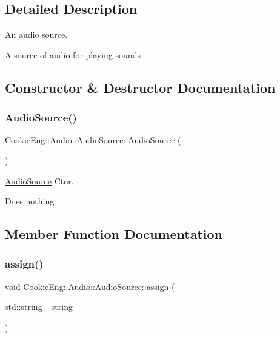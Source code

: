 \subsection{Detailed Description}
An audio source. 

A source of audio for playing sounds 

\subsection{Constructor \& Destructor Documentation}
\mbox{\label{class_cookie_eng_1_1_audio_1_1_audio_source_abf91fca0d4acf97b091efae22f3b4be8}} 
\subsubsection{\texorpdfstring{Audio\+Source()}{AudioSource()}}
{\footnotesize\ttfamily Cookie\+Eng\+::\+Audio\+::\+Audio\+Source\+::\+Audio\+Source (\begin{DoxyParamCaption}{ }\end{DoxyParamCaption})}



\hyperlink{class_cookie_eng_1_1_audio_1_1_audio_source}{Audio\+Source} Ctor. 

Does nothing 

\subsection{Member Function Documentation}
\mbox{\label{class_cookie_eng_1_1_audio_1_1_audio_source_a36d0e1b2c5702eeb1fc63236ad19e6d4}} 
\subsubsection{\texorpdfstring{assign()}{assign()}}
{\footnotesize\ttfamily void Cookie\+Eng\+::\+Audio\+::\+Audio\+Source\+::assign (\begin{DoxyParamCaption}\item[{std\+::string}]{\+\_\+string }\end{DoxyParamCaption})}



